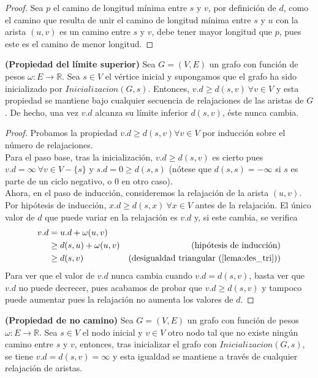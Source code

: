 \begin{proof}
	Sea $p$ el camino de longitud mínima entre $s$ y $v$, por definición de $d$, como el camino que resulta de unir el camino de longitud mínima entre $s$ y $u$ con la arista $(u,v)$ es un camino entre $s$ y $v$, debe tener mayor longitud que $p$, pues este es el camino de menor longitud.
\end{proof}

\begin{lema}\label{lema:lim_sup}
	\textbf{(Propiedad del límite superior)} Sea $G=(V,E)$ un grafo con función de pesos $\omega : E\rightarrow \mathbb{R}$. Sea $s\in V$ el vértice inicial y supongamos que el grafo ha sido inicializado por $Inicializacion(G,s)$. Entonces, $v.d \geq d(s,v)\ \forall v\in V$ y esta propiedad se mantiene bajo cualquier secuencia de relajaciones de las aristas de $G$. De hecho, una vez $v.d$ alcanza su límite inferior $d(s,v)$, éste nunca cambia.
\end{lema}

\begin{proof}
	Probamos la propiedad $v.d \geq d(s,v) \forall v\in V$ por inducción sobre el número de relajaciones. \\
	Para el paso base, tras la inicialización, $v.d \geq d(s,v)$ es cierto pues $v.d = \infty\ \forall v\in V-\{s\}$ y $s.d=0\geq d(s,s)$ (nótese que $d(s,s)=-\infty$ si $s$ es parte de un ciclo negativo, o $0$ en otro caso). \\
	Ahora, en el paso de inducción, consideremos la relajación de la arista $(u,v)$. Por hipótesis de inducción, $x.d\geq d(s,x)\ \forall x\in V$ antes de la relajación. El único valor de $d$ que puede variar en la relajación es $v.d$ y, si este cambia, se verifica
	\begin{align*}
			v.d & =u.d + \omega(u,v) \\
			& \geq d(s,u) + \omega(u,v) & (\textrm{hipótesis de inducción}) \\
			& \geq d(s,v) & (\textrm{desigualdad triangular (\autoref{lema:des_tri})})
	\end{align*}
	Para ver que el valor de $v.d$ nunca cambia cuando $v.d=d(s,v)$, basta ver que $v.d$ no puede decrecer, pues acabamos de probar que $v.d\geq d(s,v)$ y tampoco puede aumentar pues la relajación no aumenta los valores de $d$.
\end{proof}

\begin{corolario}\label{cor:no_path}
	\textbf{(Propiedad de no camino)} Sea $G=(V,E)$ un grafo con función de pesos $\omega : E\rightarrow \mathbb{R}$. Sea $s\in V$ el nodo inicial y $v\in V$ otro nodo tal que no existe ningún camino entre $s$ y $v$, entonces, tras inicializar el grafo con $Inicializacion(G,s)$, se tiene $v.d=d(s,v)=\infty$ y esta igualdad se mantiene a través de cualquier relajación de aristas.
\end{corolario}

